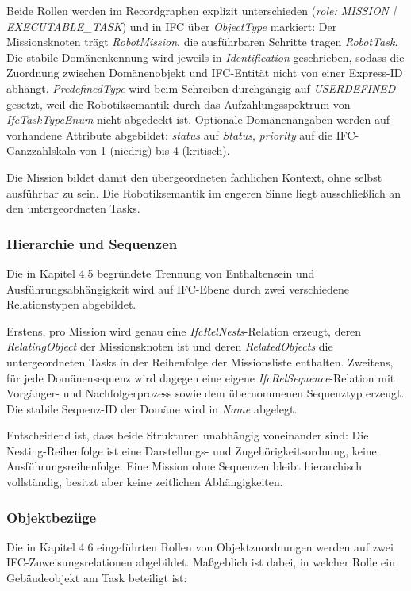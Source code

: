 Beide Rollen werden im Recordgraphen explizit unterschieden (\textit{role: \dq{}MISSION\dq{} |
\dq{}EXECUTABLE\_TASK\dq{}}) und in IFC über \textit{ObjectType} markiert: Der Missionsknoten trägt
\textit{RobotMission}, die ausführbaren Schritte tragen \textit{RobotTask}. Die stabile
Domänenkennung wird jeweils in \textit{Identification} geschrieben, sodass die Zuordnung zwischen
Domänenobjekt und IFC-Entität nicht von einer Express-ID abhängt. \textit{PredefinedType} wird beim
Schreiben durchgängig auf \textit{USERDEFINED} gesetzt, weil die Robotiksemantik durch das
Aufzählungsspektrum von \textit{IfcTaskTypeEnum} nicht abgedeckt ist. Optionale Domänenangaben
werden auf vorhandene Attribute abgebildet: \textit{status} auf \textit{Status}, \textit{priority}
auf die IFC-Ganzzahlskala von 1 (niedrig) bis 4 (kritisch).

Die Mission bildet damit den übergeordneten fachlichen Kontext, ohne selbst ausführbar zu sein. Die Robotiksemantik im engeren Sinne liegt ausschließlich an den untergeordneten Tasks.

\subsubsection{Hierarchie und Sequenzen}

Die in Kapitel 4.5 begründete Trennung von Enthaltensein und Ausführungsabhängigkeit wird auf IFC-Ebene durch zwei verschiedene Relationstypen abgebildet.

Erstens, pro Mission wird genau eine \textit{IfcRelNests}-Relation erzeugt, deren
\textit{RelatingObject} der Missionsknoten ist und deren \textit{RelatedObjects} die untergeordneten
Tasks in der Reihenfolge der Missionsliste enthalten.
Zweitens, für jede Domänensequenz wird dagegen eine eigene \textit{IfcRelSequence}-Relation mit
Vorgänger- und Nachfolgerprozess sowie dem übernommenen Sequenztyp erzeugt. Die stabile Sequenz-ID
der Domäne wird in \textit{Name} abgelegt.

Entscheidend ist, dass beide Strukturen unabhängig voneinander sind: Die Nesting-Reihenfolge ist
eine Darstellungs- und Zugehörigkeitsordnung, keine Ausführungsreihenfolge. Eine Mission ohne
Sequenzen bleibt hierarchisch vollständig, besitzt aber keine zeitlichen Abhängigkeiten.

\subsubsection{Objektbezüge}

Die in Kapitel 4.6 eingeführten Rollen von Objektzuordnungen werden auf zwei IFC-Zuweisungsrelationen abgebildet. Maßgeblich ist dabei, in welcher Rolle ein Gebäudeobjekt am Task beteiligt ist:

